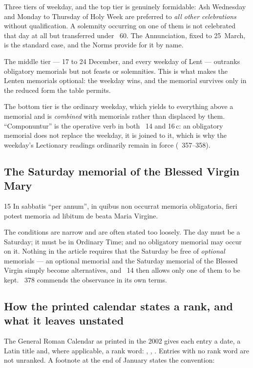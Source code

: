 Three tiers of weekday, and the top tier is genuinely formidable: Ash Wednesday and Monday to
Thursday of Holy Week are preferred to \emph{all other celebrations} without qualification. A
solemnity occurring on one of them is not celebrated that day at all but transferred under
~60. The Annunciation, fixed to 25~March, is the standard case, and the Norms provide for
it by name.

The middle tier --- 17 to 24 December, and every weekday of Lent --- outranks obligatory memorials
but not feasts or solemnities. This is what makes the Lenten memorials optional: the weekday wins,
and the memorial survives only in the reduced form the table permits.

The bottom tier is the ordinary weekday, which yields to everything above a memorial and is
\emph{combined} with memorials rather than displaced by them. ``Componuntur'' is the operative verb
in both ~14 and 16\,c: an obligatory memorial does not replace the weekday, it is joined
to it, which is why the weekday's Lectionary readings ordinarily remain in force
(~357--358).

\subsection{The Saturday memorial of the Blessed Virgin Mary}

\begin{normtext}{ 15}
In sabbatis ``per annum'', in quibus non occurrat memoria obligatoria, fieri potest memoria ad
libitum de beata Maria Virgine.
\end{normtext}

The conditions are narrow and are often stated too loosely. The day must be a Saturday; it must be
in Ordinary Time; and no obligatory memorial may occur on it. Nothing in the article requires that
the Saturday be free of \emph{optional} memorials --- an optional memorial and the Saturday memorial
of the Blessed Virgin simply become alternatives, and ~14 then allows only one of them to
be kept. ~378 commends the observance in its own terms.

\subsection{How the printed calendar states a rank, and what it leaves unstated}

The General Roman Calendar as printed in the 2002  gives each entry a
date, a Latin title and, where applicable, a rank word: , ,
. Entries with no rank word are not unranked. A footnote at the end of January states
the convention:

